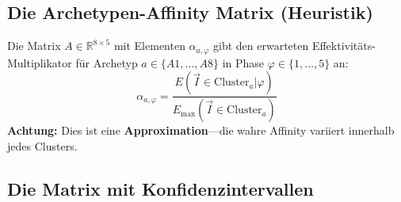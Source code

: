 \subsection{Die Archetypen-Affinity Matrix (Heuristik)}

\begin{definition}
\label{def:18-affinity-matrix}
Die Matrix $A \in \mathbb{R}^{8 \times 5}$ mit Elementen $\alpha_{a,\varphi}$ gibt den erwarteten Effektivit\"{a}ts-Multiplikator f\"{u}r Archetyp $a \in \{A1,...,A8\}$ in Phase $\varphi \in \{1,...,5\}$ an:
\begin{equation}
\alpha_{a,\varphi} = \frac{E(\vec{I} \in \text{Cluster}_a | \varphi)}{E_{\max}(\vec{I} \in \text{Cluster}_a)}
\label{eq:18-alpha-definition}
\end{equation}
\textbf{Achtung:} Dies ist eine \textbf{Approximation}---die wahre Affinity variiert innerhalb jedes Clusters.
\end{definition}

\subsection{Die Matrix mit Konfidenzintervallen}

